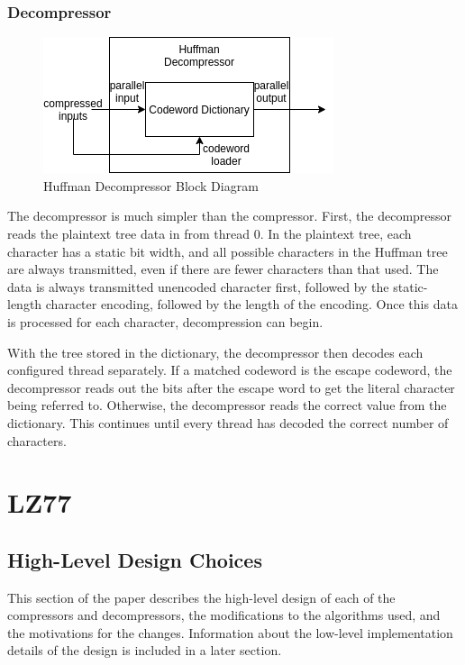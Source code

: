 \documentclass[doublespace,nopageskip]{VTthesis}
\begin{document}
\subsubsection{Decompressor}\label{sss:huffman_decompressor_implementation}

\begin{figure}[htb]
	\centering
	\includegraphics[scale=1]{Huffman Decompressor Block Diagram.png}
	\caption{Huffman Decompressor Block Diagram}
	\label{fig:huffman_decompressor_block_diagram}
\end{figure}

The decompressor is much simpler than the compressor. First, the decompressor reads the plaintext tree data in from thread 0. In the plaintext tree, each character has a static bit width, and all possible characters in the Huffman tree are always transmitted, even if there are fewer characters than that used. The data is always transmitted unencoded character first, followed by the static-length character encoding, followed by the length of the encoding. Once this data is processed for each character, decompression can begin.

With the tree stored in the dictionary, the decompressor then decodes each configured thread separately. If a matched codeword is the escape codeword, the decompressor reads out the bits after the escape word to get the literal character being referred to. Otherwise, the decompressor reads the correct value from the dictionary. This continues until every thread has decoded the correct number of characters.

\section{LZ77}\label{se:lz77}
\subsection{High-Level Design Choices}\label{se:lz77_design_choices}
This section of the paper describes the high-level design of each of the compressors and decompressors, the modifications to the algorithms used, and the motivations for the changes. Information about the low-level implementation details of the design is included in a later section.
\end{document}
